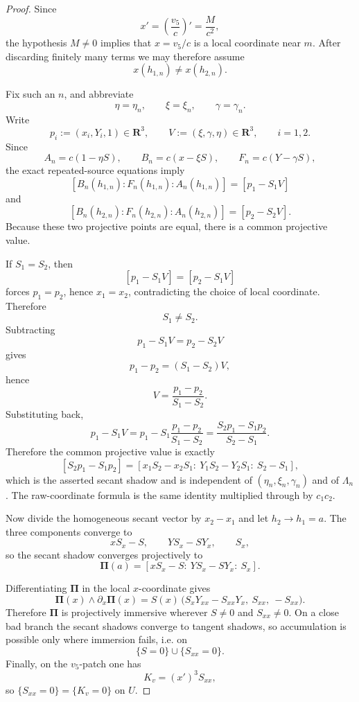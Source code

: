 \documentclass[11pt,a4paper]{amsart}
\theoremstyle{plain}
\theoremstyle{definition}
\begin{document}
\begin{proof}
Since
\[
x'=\left(\frac{v_5}{c}\right)'=\frac{M}{c^2},
\]
the hypothesis $M\neq 0$ implies that $x=v_5/c$ is a local coordinate near
$m$. After discarding finitely many terms we may therefore assume
\[
x(h_{1,n})\neq x(h_{2,n}).
\]

Fix such an $n$, and abbreviate
\[
\eta=\eta_n,\qquad \xi=\xi_n,\qquad \gamma=\gamma_n.
\]
Write
\[
p_i:=(x_i,Y_i,1)\in\mathbf R^3,
\qquad
V:=(\xi,\gamma,\eta)\in\mathbf R^3,
\qquad
i=1,2.
\]
Since
\[
A_n=c(1-\eta S),
\qquad
B_n=c(x-\xi S),
\qquad
F_n=c(Y-\gamma S),
\]
the exact repeated-source equations imply
\[
[B_n(h_{1,n}):F_n(h_{1,n}):A_n(h_{1,n})]
=
[p_1-S_1V]
\]
and
\[
[B_n(h_{2,n}):F_n(h_{2,n}):A_n(h_{2,n})]
=
[p_2-S_2V].
\]
Because these two projective points are equal, there is a common projective
value.

If $S_1=S_2$, then
\[
[p_1-S_1V]=[p_2-S_1V]
\]
forces $p_1=p_2$, hence $x_1=x_2$, contradicting the choice of local
coordinate. Therefore
\[
S_1\neq S_2.
\]
Subtracting
\[
p_1-S_1V=p_2-S_2V
\]
gives
\[
p_1-p_2=(S_1-S_2)V,
\]
hence
\[
V=\frac{p_1-p_2}{S_1-S_2}.
\]
Substituting back,
\[
p_1-S_1V
=
p_1-S_1\frac{p_1-p_2}{S_1-S_2}
=
\frac{S_2p_1-S_1p_2}{S_2-S_1}.
\]
Therefore the common projective value is exactly
\[
[S_2p_1-S_1p_2]
=
[x_1S_2-x_2S_1:\ Y_1S_2-Y_2S_1:\ S_2-S_1],
\]
which is the asserted secant shadow and is independent of
$(\eta_n,\xi_n,\gamma_n)$ and of $\Lambda_n$. The raw-coordinate formula is the
same identity multiplied through by $c_1c_2$.

Now divide the homogeneous secant vector by $x_2-x_1$ and let $h_2\to h_1=a$.
The three components converge to
\[
xS_x-S,\qquad YS_x-SY_x,\qquad S_x,
\]
so the secant shadow converges projectively to
\[
\mathbf\Pi(a)
=
[xS_x-S:\ YS_x-SY_x:\ S_x].
\]

Differentiating $\mathbf\Pi$ in the local $x$-coordinate gives
\[
\mathbf\Pi(x)\wedge \partial_x\mathbf\Pi(x)
=
S(x)\,
\bigl(
S_xY_{xx}-S_{xx}Y_x,\ S_{xx},\ -S_{xx}
\bigr).
\]
Therefore $\mathbf\Pi$ is projectively immersive wherever $S\neq 0$ and
$S_{xx}\neq 0$. On a close bad branch the secant shadows converge to tangent
shadows, so accumulation is possible only where immersion fails, i.e. on
\[
\{S=0\}\cup\{S_{xx}=0\}.
\]
Finally, on the $v_5$-patch one has
\[
K_v=(x')^3S_{xx},
\]
so $\{S_{xx}=0\}=\{K_v=0\}$ on $U$.
\end{proof}
\end{document}
